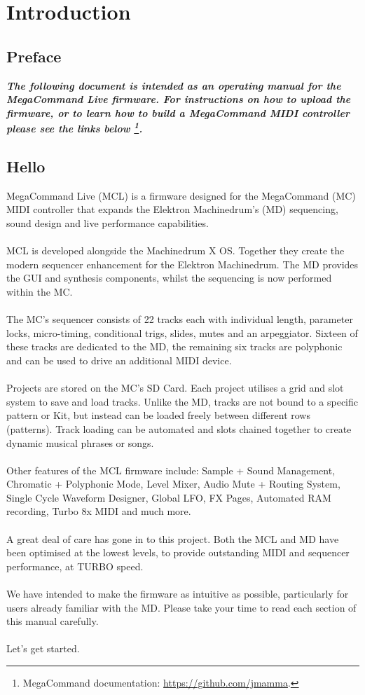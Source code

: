 \chapter{Introduction}
\section{Preface}
\begin{small}
\textbf{\textit{The following document is intended as an operating manual for the MegaCommand Live firmware. For instructions on how to upload the firmware, or to learn how to build a MegaCommand MIDI controller please see the links below \footnote{MegaCommand documentation: \url{https://github.com/jmamma}.}.}}
\end{small}

\section{Hello}
MegaCommand Live (MCL) is a firmware designed for the MegaCommand (MC) MIDI controller that expands the Elektron Machinedrum's (MD) sequencing, sound design and live performance capabilities. 
\\
\\
MCL is developed alongside the Machinedrum X OS. Together they create the modern sequencer enhancement for the Elektron Machinedrum. The MD provides the GUI and synthesis components, whilst the sequencing is now performed within the MC.
\\
\\
The MC's sequencer consists of 22 tracks each with individual length, parameter locks, micro-timing, conditional trigs, slides, mutes and an arpeggiator. Sixteen of these tracks are dedicated to the MD, the remaining six tracks are polyphonic and can be used to drive an additional MIDI device.
\\
\\
Projects are stored on the MC's SD Card. Each project utilises a grid and slot system to save and load tracks. Unlike the MD, tracks are not bound to a specific pattern or Kit, but instead can be loaded freely between different rows (patterns). Track loading can be automated and slots chained together to create dynamic musical phrases or songs. 
\\
\\
Other features of the MCL firmware include: Sample + Sound Management, Chromatic + Polyphonic Mode,  Level Mixer, Audio Mute + Routing System, Single Cycle Waveform Designer, Global LFO, FX Pages, Automated RAM recording, Turbo 8x MIDI and much more.
\\
\\
A great deal of care has gone in to this project. Both the MCL and MD have been optimised at the lowest levels, to provide outstanding MIDI and sequencer performance, at TURBO speed.
\\
\\
We have intended to make the firmware as intuitive as possible, particularly for users already familiar with the MD. Please take your time to read each section of this manual carefully. 
\\
\\
Let's get started.